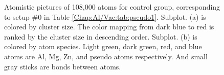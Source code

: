 \newpage
\begingroup
\begin{figure}[!ht]
  \centering
\caption[Atomistic pictures of 108,000 atoms for the control group of the sensitivity test.]{Atomistic pictures of 108,000 atoms for control group, corresponding to setup \#0 in Table \ref{Chap:Al/Vac:tab:pseudo1}. Subplot. (a) is colored by cluster size. The color mapping from dark blue to red is ranked by the cluster size in descending order. Subplot. (b) is colored by atom species. Light green, dark green, red, and blue atoms are Al, Mg, Zn, and pseudo atoms respectively. And small gray sticks are bonds between atoms.}
\label{Chap:Al/Vac:fig:sens_control}
\end{figure}
\endgroup


